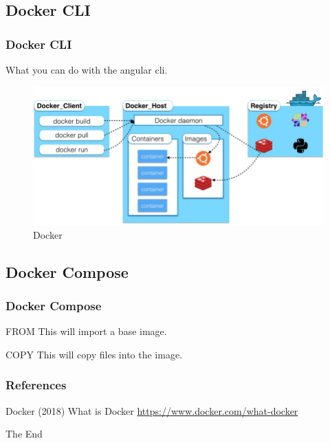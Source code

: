 \documentclass{beamer}
\begin{document}
\subsection{Docker CLI} 
\begin{frame}
    \frametitle{Docker CLI}
    What you can do with the angular cli.
    \begin{figure}
    \includegraphics[scale=0.3]{./pics/High-level-overview-of-Docker-architecture.jpg}
    \caption{Docker}
    \end{figure}
\end{frame}


\subsection{Docker Compose} 
\begin{frame}
\frametitle{Docker Compose}
\begin{block}{FROM}
This will import a base image.
\end{block}

\begin{block}{COPY}
This will copy files into the image.
\end{block}

\end{frame}


\begin{frame}
\frametitle{References}
\footnotesize{
\begin{thebibliography}{99} %
 Docker (2018)
\newblock What is Docker
\newblock \href{https://www.docker.com/what-docker}{https://www.docker.com/what-docker} 
\end{thebibliography}
}
\end{frame}


\begin{frame}
\Huge{\centerline{The End}}
\end{frame}

\end{document}
